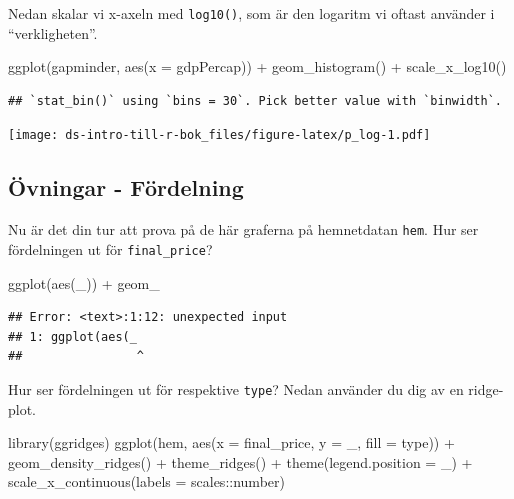 \documentclass[
]{book}
\newenvironment{Shaded}{\begin{snugshade}}{\end{snugshade}}
\newcommand{\AttributeTok}[1]{\textcolor[rgb]{0.77,0.63,0.00}{#1}}
\newcommand{\FunctionTok}[1]{\textcolor[rgb]{0.00,0.00,0.00}{#1}}
\newcommand{\NormalTok}[1]{#1}
\newcommand{\SpecialCharTok}[1]{\textcolor[rgb]{0.00,0.00,0.00}{#1}}
\begin{document}
Nedan skalar vi x-axeln med \texttt{log10()}, som är den logaritm vi oftast använder i ``verkligheten''.

\begin{Shaded}
\begin{Highlighting}[]
\FunctionTok{ggplot}\NormalTok{(gapminder, }\FunctionTok{aes}\NormalTok{(}\AttributeTok{x =}\NormalTok{ gdpPercap)) }\SpecialCharTok{+}
  \FunctionTok{geom\_histogram}\NormalTok{() }\SpecialCharTok{+}
  \FunctionTok{scale\_x\_log10}\NormalTok{()}
\end{Highlighting}
\end{Shaded}

\begin{verbatim}
## `stat_bin()` using `bins = 30`. Pick better value with `binwidth`.
\end{verbatim}

\texttt{[image: ds-intro-till-r-bok\_files/figure-latex/p\_log-1.pdf]}

\hypertarget{uxf6vningar---fuxf6rdelning}{%
\subsection{Övningar - Fördelning}\label{uxf6vningar---fuxf6rdelning}}

Nu är det din tur att prova på de här graferna på hemnetdatan \texttt{hem}.
Hur ser fördelningen ut för \texttt{final\_price}?

\begin{Shaded}
\begin{Highlighting}[]
\FunctionTok{ggplot}\NormalTok{(}\FunctionTok{aes}\NormalTok{(\_)) }\SpecialCharTok{+}
\NormalTok{  geom\_}
\end{Highlighting}
\end{Shaded}

\begin{verbatim}
## Error: <text>:1:12: unexpected input
## 1: ggplot(aes(_
##                ^
\end{verbatim}

Hur ser fördelningen ut för respektive \texttt{type}? Nedan använder du dig av en ridge-plot.

\begin{Shaded}
\begin{Highlighting}[]
\FunctionTok{library}\NormalTok{(ggridges)}
\FunctionTok{ggplot}\NormalTok{(hem, }\FunctionTok{aes}\NormalTok{(}\AttributeTok{x =}\NormalTok{ final\_price, }\AttributeTok{y =}\NormalTok{ \_, }\AttributeTok{fill =}\NormalTok{ type)) }\SpecialCharTok{+}
  \FunctionTok{geom\_density\_ridges}\NormalTok{() }\SpecialCharTok{+}
  \FunctionTok{theme\_ridges}\NormalTok{() }\SpecialCharTok{+} 
  \FunctionTok{theme}\NormalTok{(}\AttributeTok{legend.position =}\NormalTok{ \_) }\SpecialCharTok{+}
  \FunctionTok{scale\_x\_continuous}\NormalTok{(}\AttributeTok{labels =}\NormalTok{ scales}\SpecialCharTok{::}\NormalTok{number)}
\end{Highlighting}
\end{Shaded}
\end{document}

